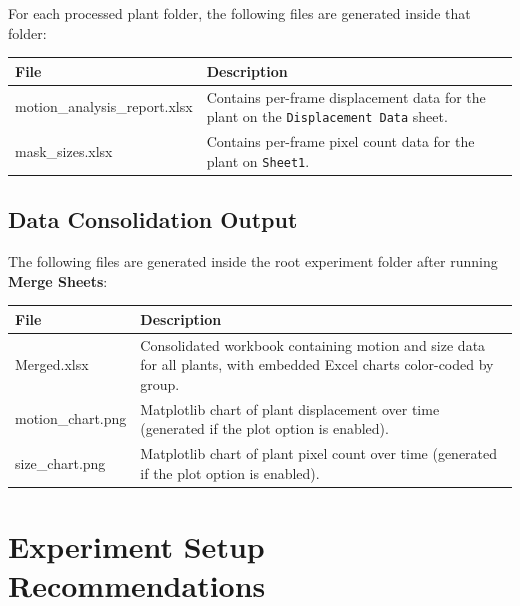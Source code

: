 \documentclass[12pt,a4paper,oneside]{report}
\begin{document}
For each processed plant folder, the following files are generated inside that folder:

\begin{table}[H]
    \centering
    \begin{tabular}{>{\ttfamily}l p{9cm}}
        \toprule
        \normalfont\textbf{File} & \textbf{Description} \\
        \midrule
        motion\_analysis\_report.xlsx & Contains per-frame displacement data for the plant on the \texttt{Displacement Data} sheet. \\
        mask\_sizes.xlsx & Contains per-frame pixel count data for the plant on \texttt{Sheet1}. \\
        \bottomrule
    \end{tabular}
\end{table}

\section*{Data Consolidation Output}

The following files are generated inside the root experiment folder after running \textbf{Merge Sheets}:

\begin{table}[H]
    \centering
    \begin{tabular}{>{\ttfamily}l p{9cm}}
        \toprule
        \normalfont\textbf{File} & \textbf{Description} \\
        \midrule
        Merged.xlsx & Consolidated workbook containing motion and size data for all plants, with embedded Excel charts color-coded by group. \\
        motion\_chart.png & Matplotlib chart of plant displacement over time (generated if the plot option is enabled). \\
        size\_chart.png & Matplotlib chart of plant pixel count over time (generated if the plot option is enabled). \\
        \bottomrule
    \end{tabular}
\end{table}

\cleardoublepage

\chapter{Experiment Setup Recommendations}
\end{document}
